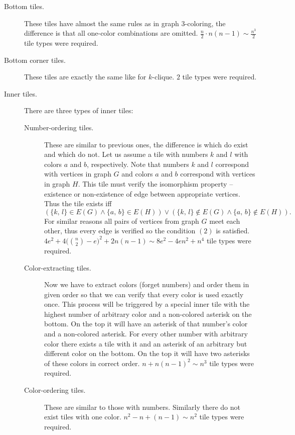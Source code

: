 \begin{description}
	\item[Bottom tiles.] These tiles have almost the same rules as in graph 3-coloring, the difference is that all one-color combinations are omitted. $\frac{n}{2} \cdot n(n-1) \sim \frac{n^3}{2}$ tile types were required.
	\item[Bottom corner tiles.] These tiles are exactly the same like for $k$-clique. $2$ tile types were required.
	\item[Inner tiles.] There are three types of inner tiles:
	\begin{description}
		\item[Number-ordering tiles.] These are similar to previous ones, the difference is which do exist and which do not. Let us assume a tile with numbers $k$ and $l$ with colors $a$ and $b$, respectively. Note that numbers $k$ and $l$ correspond with vertices in graph $G$ and colors $a$ and $b$ correspond with vertices in graph $H$. This tile must verify the isomorphism property -- existence or non-existence of edge between appropriate vertices. Thus the tile exists iff
		$$(\{k,\,l\} \in E(G) \wedge \{a,\,b\} \in E(H)) \vee (\{k,\,l\} \notin E(G) \wedge \{a,\,b\} \notin E(H)) . $$
		For similar reasons all pairs of vertices from graph $G$ meet each other, thus every edge is verified so the condition $(2)$ is satisfied. $4e^2 + 4\bigl(\binom{n}{2}-e\bigr)^2 + 2n(n-1) \sim 8e^2 - 4en^2 + n^4$ tile types were required.
		\item[Color-extracting tiles.] Now we have to extract colors (forget numbers) and order them in given order so that we can verify that every color is used exactly once. This process will be triggered by a special inner tile with the highest number of arbitrary color and a non-colored asterisk on the bottom. On the top it will have an asterisk of that number's color and a non-colored asterisk. For every other number with arbitrary color there exists a tile with it and an asterisk of an arbitrary but different color on the bottom. On the top it will have two asterisks of these colors in correct order. $n + n(n-1)^2 \sim n^3$ tile types were required.
		\item[Color-ordering tiles.] These are similar to those with numbers. Similarly there do not exist tiles with one color. $n^2 - n + (n-1) \sim n^2$ tile types were required.

\end{description}
\end{description}

